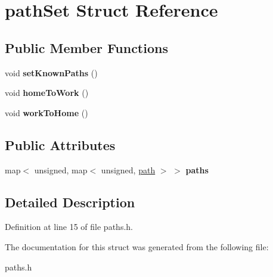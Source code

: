 \hypertarget{structpathSet}{}\section{path\+Set Struct Reference}
\label{structpathSet}
\subsection*{Public Member Functions}
\begin{DoxyCompactItemize}
\item 
\mbox{\label{structpathSet_a0b3cceea4944d26b4ad6d5096251247c}} 
void {\bfseries set\+Known\+Paths} ()
\item 
\mbox{\label{structpathSet_abee4a93e2909fd9d244daf2782447a50}} 
void {\bfseries home\+To\+Work} ()
\item 
\mbox{\label{structpathSet_ae1cbc775f4e6fc8127554ad5fffb78e5}} 
void {\bfseries work\+To\+Home} ()
\end{DoxyCompactItemize}
\subsection*{Public Attributes}
\begin{DoxyCompactItemize}
\item 
\mbox{\label{structpathSet_a440f559195d48f58aec0ead4a31eca0c}} 
map$<$ unsigned, map$<$ unsigned, \mbox{\hyperlink{structpath}{path}} $>$ $>$ {\bfseries paths}
\end{DoxyCompactItemize}


\subsection{Detailed Description}


Definition at line 15 of file paths.\+h.



The documentation for this struct was generated from the following file\+:\begin{DoxyCompactItemize}
\item 
paths.\+h\end{DoxyCompactItemize}
